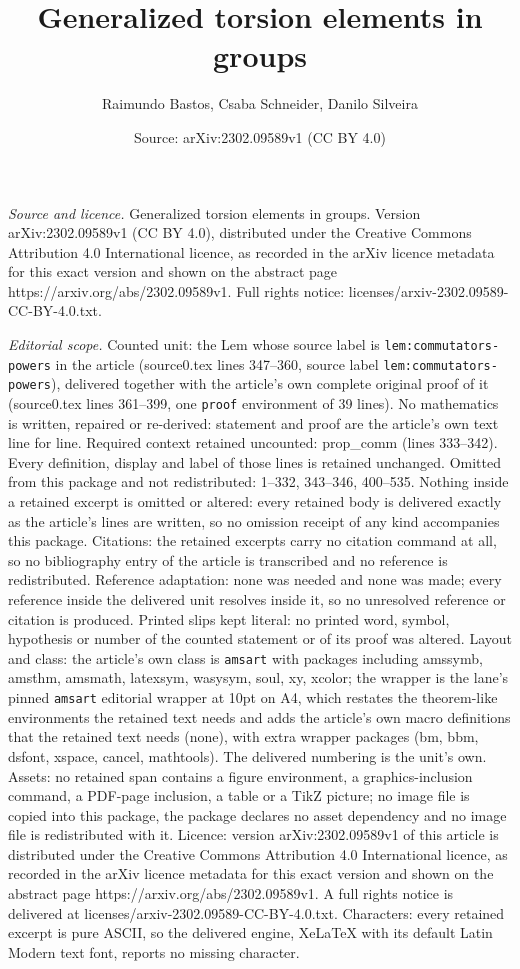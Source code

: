 \documentclass[10pt,a4paper]{amsart}
\title[Generalized torsion elements in groups]{Generalized torsion elements in groups}
\author{Raimundo Bastos, Csaba Schneider, Danilo Silveira}
\date{Source: arXiv:2302.09589v1 (CC BY 4.0)}
\begin{document}
\maketitle

\noindent\emph{Source and licence.} Generalized torsion elements in groups. Version arXiv:2302.09589v1 (CC BY 4.0), distributed under the Creative Commons Attribution 4.0 International licence, as recorded in the arXiv licence metadata for this exact version and shown on the abstract page https://arxiv.org/abs/2302.09589v1. Full rights notice: licenses/arxiv-2302.09589-CC-BY-4.0.txt.\par\smallskip

\noindent\textit{Editorial scope.} Counted unit: the Lem whose source label is \texttt{lem:commutators-powers} in the article (source0.tex lines 347--360, source label \texttt{lem:commutators-powers}), delivered together with the article's own complete original proof of it (source0.tex lines 361--399, one \texttt{proof} environment of 39 lines). No mathematics is written, repaired or re-derived: statement and proof are the article's own text line for line. Required context retained uncounted: prop\_comm (lines 333--342). Every definition, display and label of those lines is retained unchanged. Omitted from this package and not redistributed: 1--332, 343--346, 400--535. Nothing inside a retained excerpt is omitted or altered: every retained body is delivered exactly as the article's lines are written, so no omission receipt of any kind accompanies this package. Citations: the retained excerpts carry no citation command at all, so no bibliography entry of the article is transcribed and no reference is redistributed. Reference adaptation: none was needed and none was made; every reference inside the delivered unit resolves inside it, so no unresolved reference or citation is produced. Printed slips kept literal: no printed word, symbol, hypothesis or number of the counted statement or of its proof was altered. Layout and class: the article's own class is \texttt{amsart} with packages including amssymb, amsthm, amsmath, latexsym, wasysym, soul, xy, xcolor; the wrapper is the lane's pinned \texttt{amsart} editorial wrapper at 10pt on A4, which restates the theorem-like environments the retained text needs and adds the article's own macro definitions that the retained text needs (none), with extra wrapper packages (bm, bbm, dsfont, xspace, cancel, mathtools). The delivered numbering is the unit's own. Assets: no retained span contains a figure environment, a graphics-inclusion command, a PDF-page inclusion, a table or a TikZ picture; no image file is copied into this package, the package declares no asset dependency and no image file is redistributed with it. Licence: version arXiv:2302.09589v1 of this article is distributed under the Creative Commons Attribution 4.0 International licence, as recorded in the arXiv licence metadata for this exact version and shown on the abstract page https://arxiv.org/abs/2302.09589v1. A full rights notice is delivered at licenses/arxiv-2302.09589-CC-BY-4.0.txt. Characters: every retained excerpt is pure ASCII, so the delivered engine, XeLaTeX with its default Latin Modern text font, reports no missing character.
\end{document}
